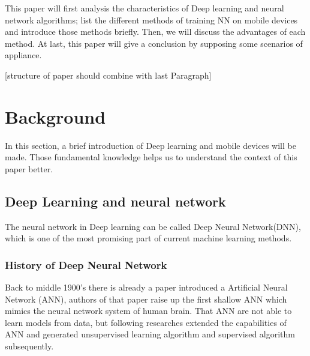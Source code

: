 \documentclass[article]{aaltoseries}
\begin{document}
This paper will first analysis the characteristics of Deep learning and neural network algorithms;
list the different methods of training NN on mobile devices and introduce those methods briefly. 
Then, we will discuss the advantages of each method.
At last, this paper will give a conclusion by supposing some scenarios of appliance.


[structure of paper should combine with last Paragraph]









\section{Background}

In this section, a brief introduction of Deep learning and mobile devices will be made. Those fundamental 
knowledge helps us to understand the context of this paper better.




\subsection{Deep Learning and neural network}

The neural network in Deep learning can be called Deep Neural Network(DNN), which is one of the most promising 
part of current machine learning methods. 

\subsubsection{History of Deep Neural Network}

Back to middle 1900's there is already a paper introduced a Artificial Neural Network (ANN)\cite{Warren1943}, authors
of that paper raise up the first shallow ANN which mimics the neural network system of human brain. That ANN are not
able to learn models from data, but following researches extended the capabilities of ANN and generated unsupervised 
learning algorithm and supervised algorithm subsequently.
\end{document}
